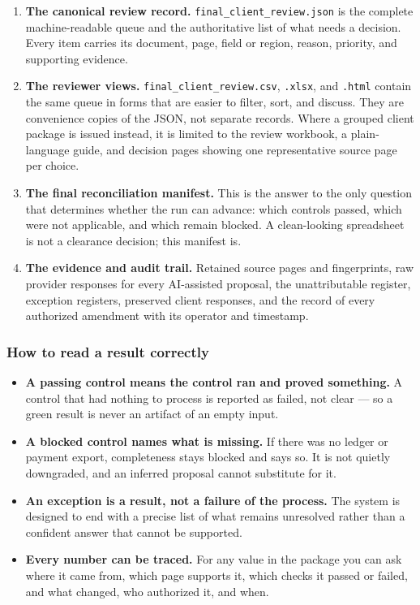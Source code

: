 \documentclass[
]{article}
\providecommand{\tightlist}{%
  \setlength{\itemsep}{0pt}\setlength{\parskip}{0pt}}
\begin{document}
\begin{enumerate}
\def\labelenumi{\arabic{enumi}.}
\item
  \textbf{The canonical review record.}
  \texttt{final\_\allowbreak{}client\_\allowbreak{}review.json} is the
  complete machine-readable queue and the authoritative list of what
  needs a decision. Every item carries its document, page, field or
  region, reason, priority, and supporting evidence.
\item
  \textbf{The reviewer views.}
  \texttt{final\_\allowbreak{}client\_\allowbreak{}review.csv},
  \texttt{.xlsx}, and \texttt{.html} contain the same queue in forms
  that are easier to filter, sort, and discuss. They are convenience
  copies of the JSON, not separate records. Where a grouped client
  package is issued instead, it is limited to the review workbook, a
  plain-language guide, and decision pages showing one representative
  source page per choice.
\item
  \textbf{The final reconciliation manifest.} This is the answer to the
  only question that determines whether the run can advance: which
  controls passed, which were not applicable, and which remain blocked.
  A clean-looking spreadsheet is not a clearance decision; this manifest
  is.
\item
  \textbf{The evidence and audit trail.} Retained source pages and
  fingerprints, raw provider responses for every AI-assisted proposal,
  the unattributable register, exception registers, preserved client
  responses, and the record of every authorized amendment with its
  operator and timestamp.
\end{enumerate}

\subsubsection{How to read a result
correctly}\label{how-to-read-a-result-correctly}

\begin{itemize}
\tightlist
\item
  \textbf{A passing control means the control ran and proved something.}
  A control that had nothing to process is reported as failed, not clear
  --- so a green result is never an artifact of an empty input.
\item
  \textbf{A blocked control names what is missing.} If there was no
  ledger or payment export, completeness stays blocked and says so. It
  is not quietly downgraded, and an inferred proposal cannot substitute
  for it.
\item
  \textbf{An exception is a result, not a failure of the process.} The
  system is designed to end with a precise list of what remains
  unresolved rather than a confident answer that cannot be supported.
\item
  \textbf{Every number can be traced.} For any value in the package you
  can ask where it came from, which page supports it, which checks it
  passed or failed, and what changed, who authorized it, and when.
\end{itemize}
\end{document}
